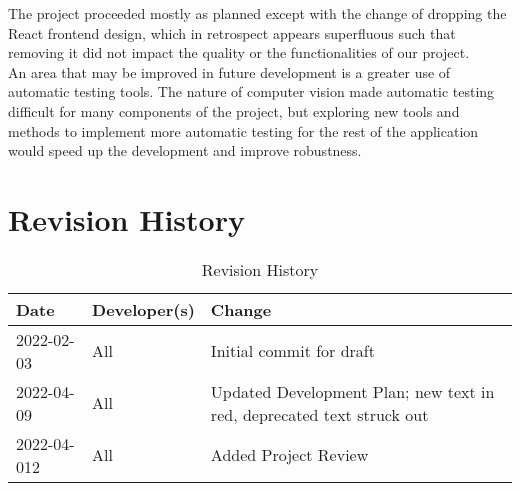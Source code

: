 \documentclass[11pt]{article}
\begin{document}
The project proceeded mostly as planned except with the change of dropping the React frontend design, which in retrospect appears superfluous such that removing it did not impact the quality or the functionalities of our project. \\

An area that may be improved in future development is a greater use of automatic testing tools. The nature of computer vision made automatic testing difficult for many components of the project, but exploring new tools and methods to implement more automatic testing for the rest of the application would speed up the development and improve robustness.

\section{Revision History}
\begin{table}[hp]
\caption{Revision History} \label{TblRevisionHistory}
\begin{tabularx}{\textwidth}{llX}
\toprule
\textbf{Date} & \textbf{Developer(s)} & \textbf{Change}\\
\midrule
2022-02-03 & All & Initial commit for draft\\
2022-04-09 & All & Updated Development Plan; new text in red, deprecated text struck out\\
2022-04-012 & All & Added Project Review\\
\bottomrule
\end{tabularx}
\end{table}
\end{document}
